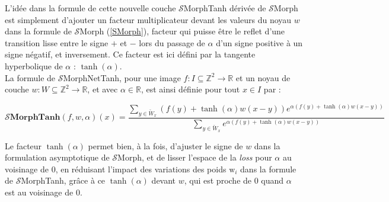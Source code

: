 L'idée dans la formule de cette nouvelle couche $\mathcal{S}$MorphTanh dérivée de $\mathcal{S}$Morph est simplement d'ajouter un facteur multiplicateur devant les valeurs du noyau $w$ dans la formule de $\mathcal{S}$Morph (\ref{SMorph}), facteur qui puisse être le reflet d'une transition lisse entre le signe $+$ et $-$ lors du passage de $\alpha$ d'un signe positive à un signe négatif, et inversement. Ce facteur est ici défini par la tangente hyperbolique de $\alpha$ : $\tanh{(\alpha)}$. \\

La formule de $\mathcal{S}$MorphNetTanh, pour une image $f: I \subseteq \mathbb{Z}^2 \rightarrow \mathbb{R}$ et un noyau de couche $w: W \subseteq \mathbb{Z}^2 \rightarrow \mathbb{R}$, et avec $\alpha \in \mathbb{R}$, est ainsi définie pour tout $x \in I$ par :

\begin{equation}
    \pmb{\mathcal{S}}\textbf{MorphTanh} (f,w,\alpha)(x) = \frac{\sum_{y \in \breve{W}_x} (f(y) + \tanh{(\alpha)} w(x-y))e^{\alpha (f(y) + \tanh{(\alpha)} w(x-y))}}{\sum_{y \in \breve{W}_x} e^{\alpha (f(y) + \tanh{(\alpha)} w(x-y))}}
    \label{SMorphTanh}
\end{equation}

\vspace{3.0mm}
\noindent Le facteur $\tanh{(\alpha)}$ permet bien, à la fois, d'ajuster le signe de $w$ dans la formulation asymptotique de $\mathcal{S}$Morph, et de lisser l'espace de la \textit{loss} pour $\alpha$ au voisinage de $0$, en réduisant l'impact des variations des poids $\text{w}_i$ dans la formule de $\mathcal{S}$MorphTanh, grâce à ce $\tanh{(\alpha)}$ devant $w$, qui est proche de $0$ quand $\alpha$ est au voisinage de $0$. \\

